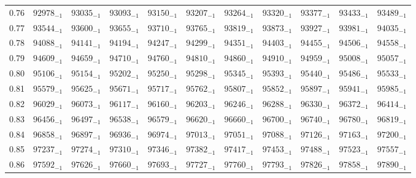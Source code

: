 \documentclass[10pt, a4paper]{article}
\begin{document}
\begin{center}
\begin{longtable}{c || c c c c c | c c c c c}
        0.76 & \({92978}_{-1}\) & \({93035}_{-1}\) & \({93093}_{-1}\) & \({93150}_{-1}\) & \({93207}_{-1}\) & \({93264}_{-1}\) & \({93320}_{-1}\) & \({93377}_{-1}\) & \({93433}_{-1}\) & \({93489}_{-1}\)\\
        0.77 & \({93544}_{-1}\) & \({93600}_{-1}\) & \({93655}_{-1}\) & \({93710}_{-1}\) & \({93765}_{-1}\) & \({93819}_{-1}\) & \({93873}_{-1}\) & \({93927}_{-1}\) & \({93981}_{-1}\) & \({94035}_{-1}\)\\
        0.78 & \({94088}_{-1}\) & \({94141}_{-1}\) & \({94194}_{-1}\) & \({94247}_{-1}\) & \({94299}_{-1}\) & \({94351}_{-1}\) & \({94403}_{-1}\) & \({94455}_{-1}\) & \({94506}_{-1}\) & \({94558}_{-1}\)\\
        0.79 & \({94609}_{-1}\) & \({94659}_{-1}\) & \({94710}_{-1}\) & \({94760}_{-1}\) & \({94810}_{-1}\) & \({94860}_{-1}\) & \({94910}_{-1}\) & \({94959}_{-1}\) & \({95008}_{-1}\) & \({95057}_{-1}\)\\
        \hline
        0.80 & \({95106}_{-1}\) & \({95154}_{-1}\) & \({95202}_{-1}\) & \({95250}_{-1}\) & \({95298}_{-1}\) & \({95345}_{-1}\) & \({95393}_{-1}\) & \({95440}_{-1}\) & \({95486}_{-1}\) & \({95533}_{-1}\)\\
        0.81 & \({95579}_{-1}\) & \({95625}_{-1}\) & \({95671}_{-1}\) & \({95717}_{-1}\) & \({95762}_{-1}\) & \({95807}_{-1}\) & \({95852}_{-1}\) & \({95897}_{-1}\) & \({95941}_{-1}\) & \({95985}_{-1}\)\\
        0.82 & \({96029}_{-1}\) & \({96073}_{-1}\) & \({96117}_{-1}\) & \({96160}_{-1}\) & \({96203}_{-1}\) & \({96246}_{-1}\) & \({96288}_{-1}\) & \({96330}_{-1}\) & \({96372}_{-1}\) & \({96414}_{-1}\)\\
        0.83 & \({96456}_{-1}\) & \({96497}_{-1}\) & \({96538}_{-1}\) & \({96579}_{-1}\) & \({96620}_{-1}\) & \({96660}_{-1}\) & \({96700}_{-1}\) & \({96740}_{-1}\) & \({96780}_{-1}\) & \({96819}_{-1}\)\\
        0.84 & \({96858}_{-1}\) & \({96897}_{-1}\) & \({96936}_{-1}\) & \({96974}_{-1}\) & \({97013}_{-1}\) & \({97051}_{-1}\) & \({97088}_{-1}\) & \({97126}_{-1}\) & \({97163}_{-1}\) & \({97200}_{-1}\)\\
        0.85 & \({97237}_{-1}\) & \({97274}_{-1}\) & \({97310}_{-1}\) & \({97346}_{-1}\) & \({97382}_{-1}\) & \({97417}_{-1}\) & \({97453}_{-1}\) & \({97488}_{-1}\) & \({97523}_{-1}\) & \({97557}_{-1}\)\\
        0.86 & \({97592}_{-1}\) & \({97626}_{-1}\) & \({97660}_{-1}\) & \({97693}_{-1}\) & \({97727}_{-1}\) & \({97760}_{-1}\) & \({97793}_{-1}\) & \({97826}_{-1}\) & \({97858}_{-1}\) & \({97890}_{-1}\)\\

\end{longtable}
\end{center}
\end{document}
